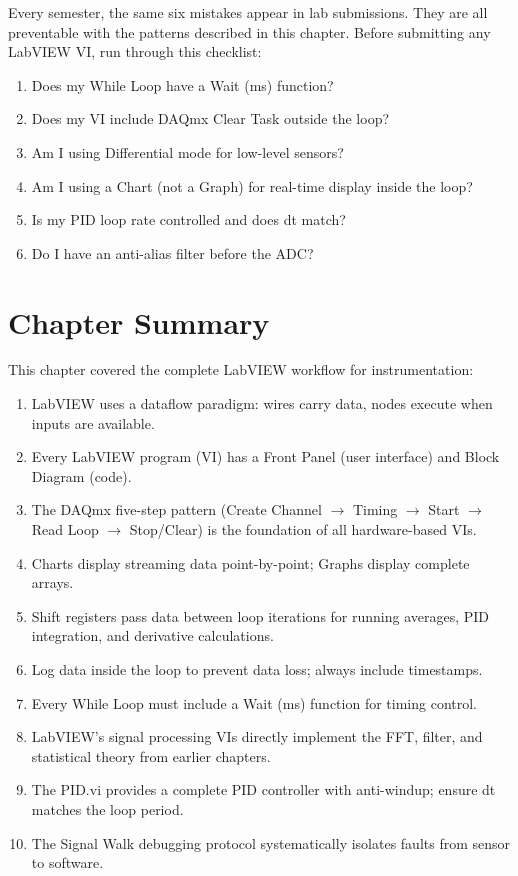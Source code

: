 \begin{warningbox}
Every semester, the same six mistakes appear in lab submissions. They are all preventable with the patterns described in this chapter. Before submitting any LabVIEW VI, run through this checklist:
\begin{enumerate}[nosep,leftmargin=1.5em]
\item Does my While Loop have a Wait (ms) function?
\item Does my VI include DAQmx Clear Task outside the loop?
\item Am I using Differential mode for low-level sensors?
\item Am I using a Chart (not a Graph) for real-time display inside the loop?
\item Is my PID loop rate controlled and does dt match?
\item Do I have an anti-alias filter before the ADC?
\end{enumerate}
\end{warningbox}

\section*{Chapter Summary}

This chapter covered the complete LabVIEW workflow for instrumentation:

\begin{enumerate}[leftmargin=1.5em]
\item LabVIEW uses a dataflow paradigm: wires carry data, nodes execute when inputs are available.
\item Every LabVIEW program (VI) has a Front Panel (user interface) and Block Diagram (code).
\item The DAQmx five-step pattern (Create Channel $\to$ Timing $\to$ Start $\to$ Read Loop $\to$ Stop/Clear) is the foundation of all hardware-based VIs.
\item Charts display streaming data point-by-point; Graphs display complete arrays.
\item Shift registers pass data between loop iterations for running averages, PID integration, and derivative calculations.
\item Log data inside the loop to prevent data loss; always include timestamps.
\item Every While Loop must include a Wait (ms) function for timing control.
\item LabVIEW's signal processing VIs directly implement the FFT, filter, and statistical theory from earlier chapters.
\item The PID.vi provides a complete PID controller with anti-windup; ensure dt matches the loop period.
\item The Signal Walk debugging protocol systematically isolates faults from sensor to software.
\end{enumerate}

